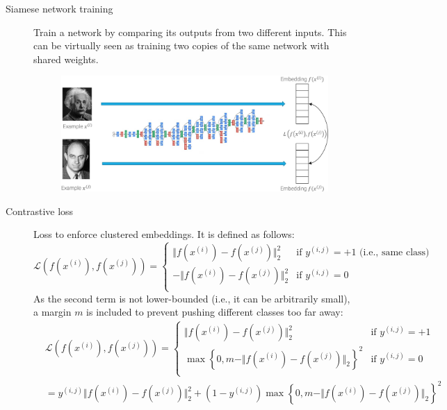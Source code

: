 \begin{description}
    \item[Siamese network training] 
        Train a network by comparing its outputs from two different inputs. This can be virtually seen as training two copies of the same network with shared weights.

        \begin{figure}[H]
            \centering
            \includegraphics[width=0.7\linewidth]{./img/_siamese_network.jpg}
        \end{figure}

        \item[Contrastive loss] 
            Loss to enforce clustered embeddings. It is defined as follows:
            \[
                \mathcal{L}\left( f(x^{(i)}), f(x^{(j)}) \right) = 
                \begin{cases}
                    \Vert f(x^{(i)}) - f(x^{(j)}) \Vert_2^2 & \text{if $y^{(i, j)} = +1$ (i.e., same class)} \\
                    - \Vert f(x^{(i)}) - f(x^{(j)}) \Vert_2^2 & \text{if $y^{(i, j)} = 0$} \\
                \end{cases}
            \]
            As the second term is not lower-bounded (i.e., it can be arbitrarily small), a margin $m$ is included to prevent pushing different classes too far away:
            \[
                \begin{split}
                    &\mathcal{L}\left( f(x^{(i)}), f(x^{(j)}) \right) = 
                    \begin{cases}
                        \Vert f(x^{(i)}) - f(x^{(j)}) \Vert_2^2 & \text{if $y^{(i, j)} = +1$} \\
                        \max\left\{0, m - \Vert f(x^{(i)}) - f(x^{(j)}) \Vert_2\right\}^2 & \text{if $y^{(i, j)} = 0$} \\
                    \end{cases} \\
                    &= y^{(i, j)} \Vert f(x^{(i)}) - f(x^{(j)}) \Vert_2^2 + (1-y^{(i, j)}) \max\left\{0, m - \Vert f(x^{(i)}) - f(x^{(j)}) \Vert_2\right\}^2
                \end{split}
            \]


\end{description}
